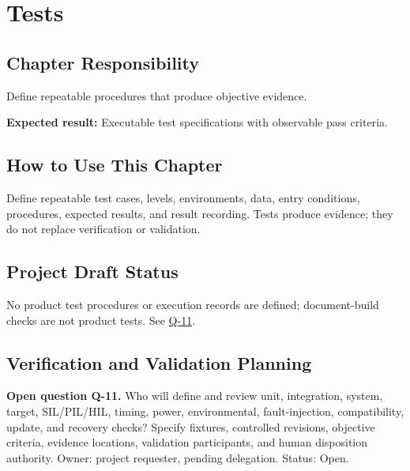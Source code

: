 \chapter{Tests}
\section{Chapter Responsibility}
\label{Section:TestsResponsibility}
Define repeatable procedures that produce objective evidence.

\noindent\textbf{Expected result:} Executable test specifications with observable pass criteria.

\section{How to Use This Chapter}
Define repeatable test cases, levels, environments, data, entry conditions, procedures, expected results, and result recording. Tests produce evidence; they do not replace verification or validation.
\section{Project Draft Status}
No product test procedures or execution records are defined; document-build checks are not product tests. See \hyperref[Question:Q-11]{Q-11}.
\section{Verification and Validation Planning}
\label{Question:Q-11}
\par\noindent\textbf{Open question Q-11.} Who will define and review unit, integration, system, target, SIL/PIL/HIL, timing, power, environmental, fault-injection, compatibility, update, and recovery checks? Specify fixtures, controlled revisions, objective criteria, evidence locations, validation participants, and human disposition authority. Owner: project requester, pending delegation. Status: Open.
